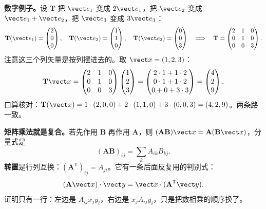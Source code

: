 \documentclass[11pt]{ctexart}
\newcommand{\ten}[1]{\mathbf{#1}}
\let\origsubhdr\subhdr
\renewcommand{\subhdr}[1]{\par\needspace{3\baselineskip}\origsubhdr{#1}}
\begin{document}
\textbf{数字例子。}设 $\ten T$ 把 $\vect e_1$ 变成 $2\vect e_1$，把 $\vect e_2$ 变成 $\vect e_1+\vect e_2$，把 $\vect e_3$ 变成 $3\vect e_3$：
\[
\ten T(\vect e_1)=\begin{pmatrix}2\\0\\0\end{pmatrix},\quad
\ten T(\vect e_2)=\begin{pmatrix}1\\1\\0\end{pmatrix},\quad
\ten T(\vect e_3)=\begin{pmatrix}0\\0\\3\end{pmatrix}
\quad\Longrightarrow\quad
\ten T=\begin{pmatrix}2&1&0\\0&1&0\\0&0&3\end{pmatrix}.
\]
注意这三个列矢量是按列摆进去的。取 $\vect x=(1,2,3)$：
\[
\ten T\vect x=\begin{pmatrix}2&1&0\\0&1&0\\0&0&3\end{pmatrix}\begin{pmatrix}1\\2\\3\end{pmatrix}
=\begin{pmatrix}2\cdot1+1\cdot2\\0\cdot1+1\cdot2\\0+0+3\cdot3\end{pmatrix}=\begin{pmatrix}4\\2\\9\end{pmatrix}.
\]
口算核对：$\ten T(\vect x)=1\cdot(2,0,0)+2\cdot(1,1,0)+3\cdot(0,0,3)=(4,2,9)$。两条路一致。

\textbf{矩阵乘法就是复合。}若先作用 $\ten B$ 再作用 $\ten A$，则 $(\ten A\ten B)\vect x=\ten A(\ten B\vect x)$，分量式是
\[
(\ten A\ten B)_{ij}=\sum_k A_{ik}B_{kj}.
\]
\textbf{转置}是行列互换：$(\ten A^{\mathsf T})_{ij}=A_{ji}$。它有一条后面反复用的判别式：
\[
(\ten A\vect x)\cdot\vect y=\vect x\cdot(\ten A^{\mathsf T}\vect y).
\]
证明只有一行：左边是 $A_{ij}x_jy_i$，右边是 $x_jA_{ij}y_i$，只是把数相乘的顺序换了。

\end{document}
